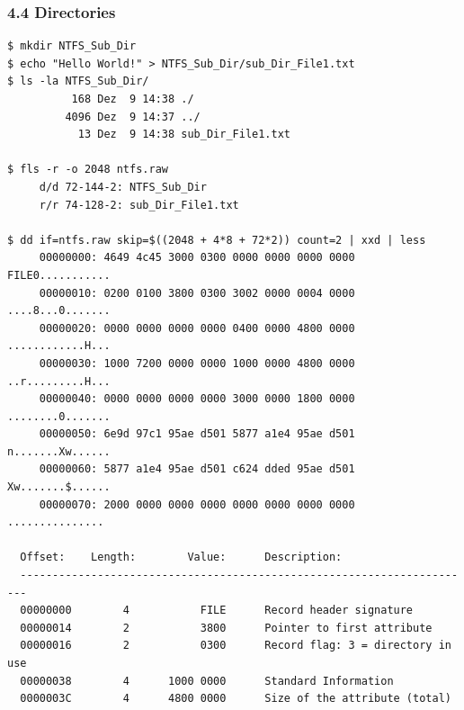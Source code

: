 \begin{frame}[fragile]
  \frametitle{4.4 Directories}
  \begin{lstlisting}[basicstyle=\tiny]
$ mkdir NTFS_Sub_Dir
$ echo "Hello World!" > NTFS_Sub_Dir/sub_Dir_File1.txt
$ ls -la NTFS_Sub_Dir/
          168 Dez  9 14:38 ./
         4096 Dez  9 14:37 ../
           13 Dez  9 14:38 sub_Dir_File1.txt

$ fls -r -o 2048 ntfs.raw
     d/d 72-144-2: NTFS_Sub_Dir
     r/r 74-128-2: sub_Dir_File1.txt

$ dd if=ntfs.raw skip=$((2048 + 4*8 + 72*2)) count=2 | xxd | less
     00000000: 4649 4c45 3000 0300 0000 0000 0000 0000  FILE0...........
     00000010: 0200 0100 3800 0300 3002 0000 0004 0000  ....8...0.......
     00000020: 0000 0000 0000 0000 0400 0000 4800 0000  ............H...
     00000030: 1000 7200 0000 0000 1000 0000 4800 0000  ..r.........H...
     00000040: 0000 0000 0000 0000 3000 0000 1800 0000  ........0.......
     00000050: 6e9d 97c1 95ae d501 5877 a1e4 95ae d501  n.......Xw......
     00000060: 5877 a1e4 95ae d501 c624 dded 95ae d501  Xw.......$......
     00000070: 2000 0000 0000 0000 0000 0000 0000 0000   ...............
  
  Offset:    Length:        Value:      Description:
  -----------------------------------------------------------------------
  00000000        4           FILE      Record header signature
  00000014        2           3800      Pointer to first attribute
  00000016        2           0300      Record flag: 3 = directory in use
  00000038        4      1000 0000      Standard Information
  0000003C        4      4800 0000      Size of the attribute (total)
  \end{lstlisting}
\end{frame}


